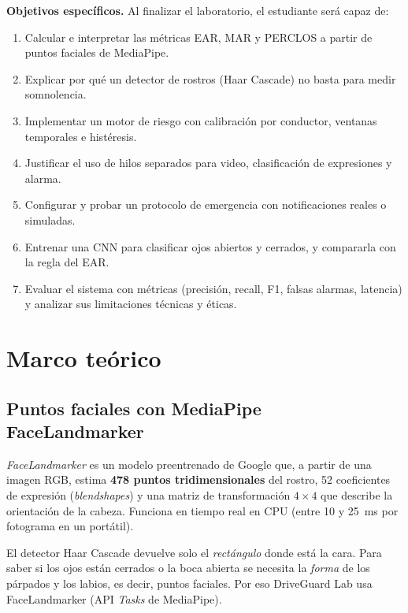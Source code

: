 \documentclass[11pt,a4paper]{article}
\begin{document}
\textbf{Objetivos específicos.} Al finalizar el laboratorio, el estudiante será capaz de:
\begin{enumerate}
  \item Calcular e interpretar las métricas EAR, MAR y PERCLOS a partir de puntos faciales de MediaPipe.
  \item Explicar por qué un detector de rostros (Haar Cascade) no basta para medir somnolencia.
  \item Implementar un motor de riesgo con calibración por conductor, ventanas temporales e histéresis.
  \item Justificar el uso de hilos separados para video, clasificación de expresiones y alarma.
  \item Configurar y probar un protocolo de emergencia con notificaciones reales o simuladas.
  \item Entrenar una CNN para clasificar ojos abiertos y cerrados, y compararla con la regla del EAR.
  \item Evaluar el sistema con métricas (precisión, recall, F1, falsas alarmas, latencia) y analizar sus
        limitaciones técnicas y éticas.
\end{enumerate}

\section{Marco teórico}
\subsection{Puntos faciales con MediaPipe FaceLandmarker}
\emph{FaceLandmarker} es un modelo preentrenado de Google que, a partir de una imagen RGB, estima
\textbf{478 puntos tridimensionales} del rostro, 52 coeficientes de expresión (\emph{blendshapes}) y una
matriz de transformación $4\times4$ que describe la orientación de la cabeza. Funciona en tiempo real en
CPU (entre 10 y \SI{25}{ms} por fotograma en un portátil).

\begin{nota}
El detector Haar Cascade devuelve solo el \emph{rectángulo} donde está la cara. Para saber si los ojos están
cerrados o la boca abierta se necesita la \emph{forma} de los párpados y los labios, es decir, puntos
faciales. Por eso DriveGuard Lab usa FaceLandmarker (API \emph{Tasks} de MediaPipe).
\end{nota}
\end{document}
